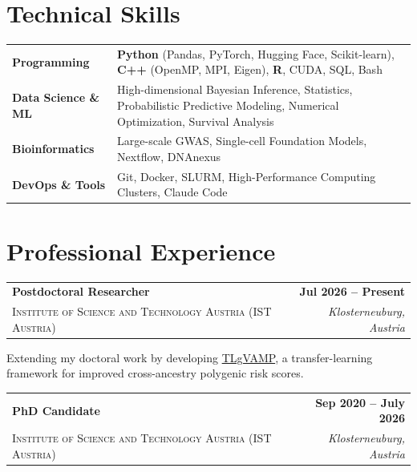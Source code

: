 \documentclass[a4paper,11pt]{article}
\makeatletter
\newcommand{\roleheader}[4]{
    \noindent
    \begin{tabularx}{\linewidth}{@{} X r @{}}
        {\Large \textbf{\textcolor{primary}{#1}}} & {\normalsize \textbf{#2}} \\
        {\normalsize \textsc{#3}} & {\normalsize \textit{#4}}
    \end{tabularx}
    \vspace{2pt}
}
\makeatother
\begin{document}
\section{Technical Skills}
\begin{tabularx}{\linewidth}{@{}l X@{}}
\textbf{Programming} & \textbf{Python} (Pandas, PyTorch, Hugging Face, Scikit-learn), \textbf{C++} (OpenMP, MPI, Eigen), \textbf{R}, CUDA, SQL, Bash \\[4pt]
\textbf{Data Science \& ML} & High-dimensional Bayesian Inference, Statistics, Probabilistic Predictive Modeling, Numerical Optimization, Survival Analysis\\[4pt]
\textbf{Bioinformatics} & Large-scale GWAS, Single-cell Foundation Models, Nextflow, DNAnexus \\[4pt]
\textbf{DevOps \& Tools} & Git, Docker, SLURM, High-Performance Computing Clusters, Claude Code
\end{tabularx}

\section{Professional Experience}
\roleheader{Postdoctoral Researcher}{Jul 2026 -- Present}{Institute of Science and Technology Austria (IST Austria)}{Klosterneuburg, Austria}

\noindent Extending my doctoral work by developing \href{https://github.com/ADepope/TLgVAMP/tree/main}{TLgVAMP}, a transfer-learning framework for improved cross-ancestry polygenic risk scores.

\vspace{8pt}

\roleheader{PhD Candidate}{Sep 2020 -- July 2026}{Institute of Science and Technology Austria (IST Austria)}{Klosterneuburg, Austria}
\end{document}
